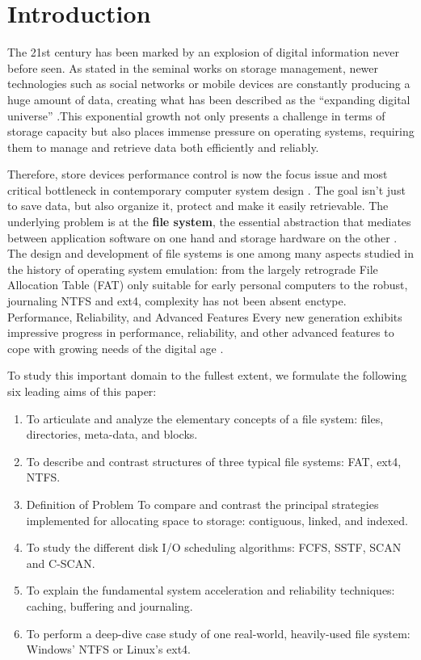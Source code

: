 \documentclass[12pt]{article}
\begin{document}
\section{Introduction}
The 21st century has been marked by an explosion of digital information never before seen. As stated in the seminal works on storage management, newer technologies such as social networks or mobile devices are constantly producing a huge amount of data, creating what has been described as the ``expanding digital universe'' \parencite{EMC2012InformationStorage}.This exponential growth not only presents a challenge in terms of storage capacity but also places immense pressure on operating systems, requiring them to manage and retrieve data both efficiently and reliably.

Therefore, store devices performance control is now the focus issue and most critical bottleneck in contemporary computer system design \parencite{Pokharel2021}. The goal isn’t just to save data, but also organize it, protect and make it easily retrievable. The underlying problem is at the \textbf{file system}, the essential abstraction that mediates between application software on one hand and storage hardware on the other \parencite{Silberschatz2018}. The design and development of file systems is one among many aspects studied in the history of operating system emulation: from the largely retrograde File Allocation Table (FAT) only suitable for early personal computers to the robust, journaling NTFS and ext4, complexity has not been absent enctype. Performance, Reliability, and Advanced Features Every new generation exhibits impressive progress in performance, reliability, and other advanced features to cope with growing needs of the digital age \parencite{Tanenbaum2014}.


To study this important domain to the fullest extent, we formulate the following six leading aims of this paper:
\begin{enumerate}
    \item To articulate and analyze the elementary concepts of a file system: files, directories, meta-data, and blocks.
    \item To describe and contrast structures of three typical file systems: FAT, ext4, NTFS.
    \item Definition of Problem To compare and contrast the principal strategies implemented for allocating space to storage: contiguous, linked, and indexed.
    \item To study the different disk I/O scheduling algorithms: FCFS, SSTF, SCAN and C-SCAN.
    \item To explain the fundamental system acceleration and reliability techniques: caching, buffering and journaling.
    \item To perform a deep-dive case study of one real-world, heavily-used file system: Windows’ NTFS or Linux’s ext4.
\end{enumerate}
\end{document}
